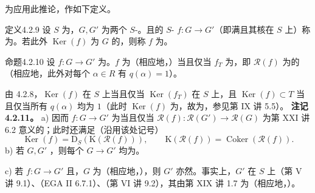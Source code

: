 为应用此推论，作如下定义。
\begin{SGAresult}{定义}{4.2.9} 设 $S$ 为，$G,G'$ 为两个 $S$-。且的 $S$- $f:G\to G'$（即满且其核在 $S$ 上）称为。若此外 $\operatorname{Ker}(f)$ 为 $G$ 的，则称 $f$ 为。\end{SGAresult}
\begin{SGAresult}{命题}{4.2.10} 设 $f:G\to G'$ 为。$f$ 为（相应地，）当且仅当 $f_T$ 为，即 $\mathcal R(f)$ 为的（相应地，此外对每个 $\alpha\in R$ 有 $q(\alpha)=1$）。\end{SGAresult}
由 4.2.8，$\operatorname{Ker}(f)$ 在 $S$ 上当且仅当 $\operatorname{Ker}(f_T)$ 在 $S$ 上，且 $\operatorname{Ker}(f)\subset T$ 当且仅当所有 $q(\alpha)$ 均为 $1$（此时 $\operatorname{Ker}(f)$ 为，故为，参见第 IX 讲 5.5）。
\textbf{注记 4.2.11。} a) 因而 $f:G\to G'$ 为当且仅当 $\mathcal R(f):\mathcal R(G')\to\mathcal R(G)$ 为第 XXI 讲 6.2 意义的；此时还满足（沿用该处记号）
\[\operatorname{Ker}(f)=\mathrm D_S(\mathrm K(\mathcal R(f))),\qquad\mathrm K(\mathcal R(f))=\operatorname{Coker}(\mathcal R(f)).\]
b) 若 $G,G'$ ，则每个 $G\to G'$ 均为。

c) 若 $f:G\to G'$ 且，$G$ 为（相应地，），则 $G'$ 亦然。事实上，$G'$ 在 $S$ 上（第 V 讲 9.1）、（EGA II 6.7.1）、（第 VI 讲 9.2），其由第 XIX 讲 1.7 为（相应地，）。


